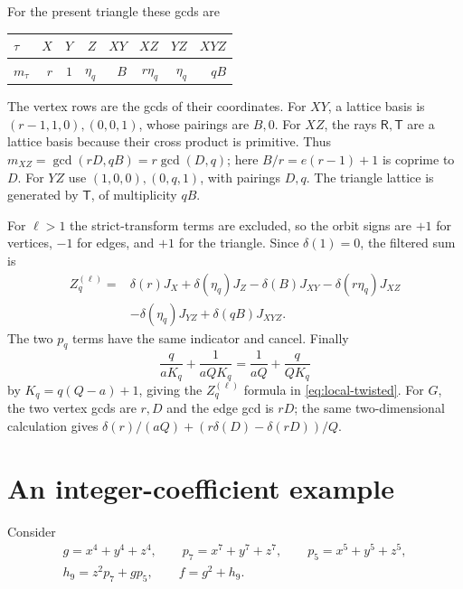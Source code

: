 \documentclass[11pt]{article}
\numberwithin{equation}{section}
\theoremstyle{definition}
\theoremstyle{remark}
\begin{document}
For the present triangle these gcds are
\begin{center}
\begin{tabular}{lrrrrrrr}
\toprule
$\tau$ & $X$ & $Y$ & $Z$ & $XY$ & $XZ$ & $YZ$ & $XYZ$\\
\midrule
$m_\tau$ & $r$ & $1$ & $\eta_q$ & $B$ &
            $r\eta_q$ & $\eta_q$ & $qB$\\
\bottomrule
\end{tabular}
\end{center}
The vertex rows are the gcds of their coordinates.
For $XY$, a lattice basis is $(r-1,1,0),(0,0,1)$,
whose pairings are $B,0$.
For $XZ$, the rays $\mathsf R,\mathsf T$ are a lattice basis
because their cross product is primitive. Thus
$m_{XZ}=\gcd(rD,qB)=r\gcd(D,q)$; here
$B/r=e(r-1)+1$ is coprime to $D$.
For $YZ$ use $(1,0,0),(0,q,1)$, with pairings $D,q$.
The triangle lattice is generated by $\mathsf T$, of
multiplicity $qB$.

For $\ell>1$ the strict-transform terms are excluded, so the
orbit signs are $+1$ for vertices, $-1$ for edges, and $+1$
for the triangle. Since $\delta(1)=0$, the filtered sum is
\begin{equation}\label{eq:filtered-cones}
 \begin{aligned}
 Z_q^{(\ell)}={}&\delta(r)J_X+\delta(\eta_q)J_Z
      -\delta(B)J_{XY}-\delta(r\eta_q)J_{XZ}\\
      &-\delta(\eta_q)J_{YZ}+\delta(qB)J_{XYZ}.
 \end{aligned}
\end{equation}
The two $p_q$ terms have the same indicator and cancel.
Finally
\[
 \frac q{aK_q}+\frac1{aQK_q}
       =\frac1{aQ}+\frac q{QK_q}
\]
by $K_q=q(Q-a)+1$, giving the $Z_q^{(\ell)}$ formula
in \eqref{eq:local-twisted}.
For $G$, the two vertex gcds are $r,D$ and the edge gcd
is $rD$; the same two-dimensional calculation gives
$\delta(r)/(aQ)+(r\delta(D)-\delta(rD))/Q$.

\section{An integer-coefficient example}\label{app:example}

Consider
\begin{equation}\label{eq:integer-example}
 \begin{gathered}
  g=x^4+y^4+z^4,\qquad p_7=x^7+y^7+z^7,\qquad
  p_5=x^5+y^5+z^5,\\
  h_9=z^2p_7+gp_5,\qquad f=g^2+h_9.
 \end{gathered}
\end{equation}
\end{document}
